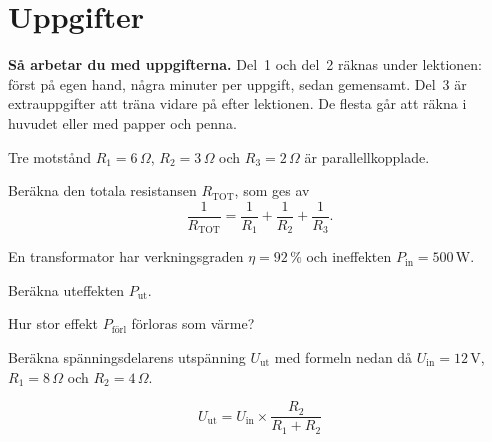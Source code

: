 
\section{Uppgifter}
\label{c2:sec:uppgifter}

\begin{aside}
\textbf{Så arbetar du med uppgifterna.} Del~1 och del~2 räknas under lektionen: först på egen
hand, några minuter per uppgift, sedan gemensamt. Del~3 är extrauppgifter att träna vidare på
efter lektionen. De flesta går att räkna i huvudet eller med papper och penna.

\end{aside}


Tre motstånd $R_1 = 6\,\Omega$, $R_2 = 3\,\Omega$ och $R_3 = 2\,\Omega$ är parallellkopplade.


Beräkna den totala resistansen $R_{\text{TOT}}$, som ges av
\[
  \frac{1}{R_{\text{TOT}}} = \frac{1}{R_1} + \frac{1}{R_2} + \frac{1}{R_3}.
\]

En transformator har verkningsgraden $\eta = 92\,\%$ och ineffekten $P_{\text{in}} = 500\,\text{W}$.


\begin{parts}
  \item Beräkna uteffekten $P_{\text{ut}}$.
  \item Hur stor effekt $P_{\text{förl}}$ förloras som värme?
\end{parts}

Beräkna spänningsdelarens utspänning $U_{\text{ut}}$ med formeln nedan då
$U_{\text{in}} = 12\,\text{V}$, $R_1 = 8\,\Omega$ och $R_2 = 4\,\Omega$.


\[
  U_{\text{ut}} = U_{\text{in}} \times \frac{R_2}{R_1 + R_2}
\]


